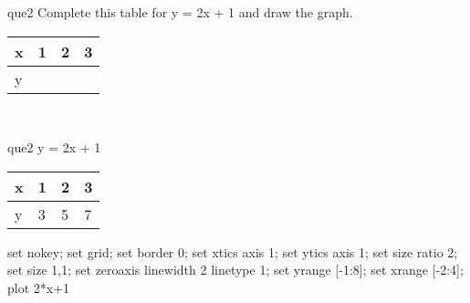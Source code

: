 \documentclass[13.5pt, varwidth=true]{beamer}
\begin{document}
\begin{frame}[shrink=19,fragile]
	\begin{beamercolorbox}[rounded=true, left, shadow=true,wd=14.8cm]{que2}
		 Complete this table for y = 2x + 1 and draw the graph. \\[0.3cm] \renewcommand{\arraystretch}{1.2}\begin{tabular}{|C|C|C|C|} \hline x & 1 & 2 & 3 \\ \hline y & & & \\ \hline \end{tabular}\\[0.3cm]
	\end{beamercolorbox}
\end{frame}
\begin{frame}[shrink=19,fragile]
	\begin{beamercolorbox}[rounded=true, left, shadow=true,wd=14.8cm]{que2}
		y = 2x + 1\renewcommand{\arraystretch}{1.2}\begin{tabular}{|C|C|C|C|} \hline x & 1 & 2 & 3 \\ \hline y & 3 & 5 & 7\\ \hline \end{tabular}\begin{gnuplot}[terminal=pdf] set nokey; set grid; set border 0; set xtics axis 1; set ytics axis 1; set size ratio 2; set size 1,1; set zeroaxis linewidth 2 linetype 1; set yrange [-1:8]; set xrange [-2:4]; plot 2*x+1 \end{gnuplot}
	\end{beamercolorbox}
\end{frame}
\end{document}
